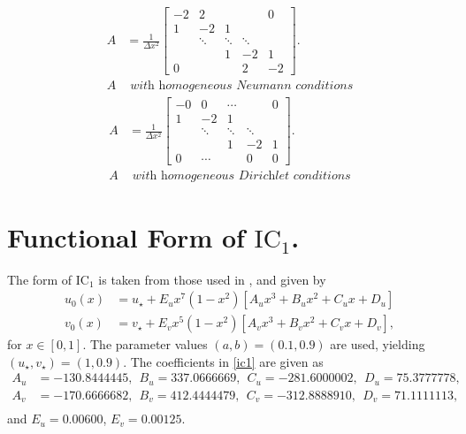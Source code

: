 \begin{multicols}{2}
\begin{equation}\label{Aneumann}
    \begin{split}
A&=\frac{1}{\Delta x^2}\begin{bmatrix}
   -2&  2&  &  & 0\\
   1&  -2&  1&  & \\
   &  \ddots&  \ddots&  \ddots& \\
   &  &  1&  -2& 1\\
   0&  &  &  2& -2
  \end{bmatrix}.\\
  A &\textit{ with homogeneous Neumann conditions}
    \end{split}
\end{equation}
\break
\begin{equation}\label{Adirichlet}
    \begin{split}
A&=\frac{1}{\Delta x^2}\begin{bmatrix}
   -0&  0& \cdots &  & 0\\
   1&  -2&  1&  & \\
   &  \ddots&  \ddots&  \ddots& \\
   &  &  1&  -2& 1\\
   0&\cdots  &  &  0& 0
  \end{bmatrix}.\\
  A & \textit{ with homogeneous Dirichlet conditions}
    \end{split}
\end{equation}
\end{multicols}


\section{Functional Form of $\text{IC}_1$.}
The form of $\text{IC}_1$ is taken from those used in \cite{gaffmonk}, and given by
\begin{equation}\label{ic1}
    \begin{split}
    u_0(x)&=u_\star+E_ux^7(1-x^2)[A_ux^3+B_ux^2+C_ux+D_u]\\
    v_0(x)&=v_\star+E_vx^5(1-x^2)[A_vx^3+B_vx^2+C_vx+D_v],
    \end{split}
\end{equation}
for $x\in[0,1]$. The parameter values $(a,b)=(0.1,0.9)$ are used, yielding $(u_\star,v_\star)=(1,0.9)$. The coefficients in \eqref{ic1} are given as
\begin{align*}
A_u&=-130.8444445,\ \ B_u=337.0666669,\ \ C_u=-281.6000002,\ \ D_u=75.3777778,\\
A_v&=-170.6666682,\ \ B_v=412.4444479,\ \ C_v=-312.8888910,\ \ D_v=71.1111113,\\
\end{align*}
and $E_u=0.00600$, $E_v=0.00125$.
